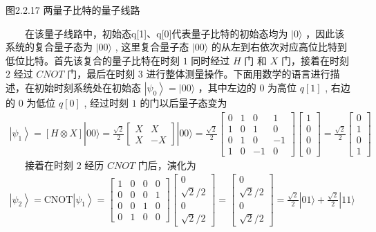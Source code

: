 \documentclass[a4paper,11pt,english]{sphinxmanual}
\begin{document}
\begin{center}图2.2.17 两量子比特的量子线路
\end{center}
\sphinxAtStartPar
  在该量子线路中，初始态q{[}1{]}、q{[}0{]}代表量子比特的初始态均为  \(|0\rangle\) ，因此该系统的复合量子态为  \(|00\rangle\) , 这里复合量子态 \(|00\rangle\) 的从左到右依次对应高位比特到低位比特。首先该复合的量子比特在时刻 \(1\) 同时经过 \(H\) 门 和 \(X\) 门，接着在时刻 \(2\) 经过 \(CNOT\) 门，最后在时刻 \(3\) 进行整体测量操作。下面用数学的语言进行描述，在初始时刻系统处在初始态  \(\left|\psi_{0}\right\rangle=|00\rangle\) ，其中左边的 0 为高位 \(q[1]\) , 右边的 0 为低位 \(q[0]\) , 经过时刻 \(1\) 的门以后量子态变为
\begin{equation*}
\begin{split}\left|\psi_{1}\right\rangle=[H \otimes X]|00\rangle=\frac{\sqrt{2}}{2}\left[\begin{array}{cc} X & X \\ X & -X \end{array}\right]|00\rangle=\frac{\sqrt{2}}{2}\left[\begin{array}{cccc} 0 & 1 & 0 & 1 \\ 1 & 0 & 1 & 0 \\ 0 & 1 & 0 & -1 \\ 1 & 0 & -1 & 0 \end{array}\right]\left[\begin{array}{l} 1 \\ 0 \\ 0 \\ 0 \end{array}\right]=\frac{\sqrt{2}}{2}\left[\begin{array}{l} 0 \\ 1 \\ 0 \\ 1 \end{array}\right]\end{split}
\end{equation*}
\sphinxAtStartPar
  接着在时刻 \(2\) 经历 \(CNOT\) 门后，演化为
\begin{equation*}
\begin{split}\left|\psi_{2}\right\rangle=\mathrm{CNOT}\left|\psi_{1}\right\rangle=\left[\begin{array}{cccc} 1 & 0 & 0 & 0 \\ 0 & 0 & 0 & 1 \\ 0 & 0 & 1 & 0 \\ 0 & 1 & 0 & 0 \end{array}\right]\left[\begin{array}{c} 0 \\ \sqrt{2} / 2 \\ 0 \\ \sqrt{2} / 2 \end{array}\right]=\left[\begin{array}{c} 0 \\ \sqrt{2} / 2 \\ 0 \\ \sqrt{2} / 2 \end{array}\right]=\frac{\sqrt{2}}{2}|01\rangle+\frac{\sqrt{2}}{2}|11\rangle\end{split}
\end{equation*}
\end{document}
